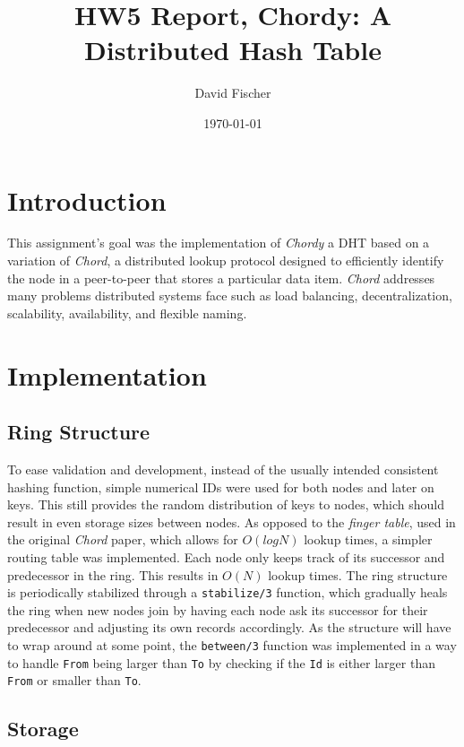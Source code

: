 \documentclass[a4paper, 11pt]{article}
\title{HW5 Report, Chordy: A Distributed Hash Table}
\author{David Fischer}
\date{\today{}}
\begin{document}
\maketitle

\section{Introduction}
This assignment's goal was the implementation of \textit{Chordy} a DHT based on a variation of \textit{Chord}, a distributed lookup protocol designed to efficiently identify the node in a peer-to-peer that stores a particular data item.
\textit{Chord} addresses many problems distributed systems face such as load balancing, decentralization, scalability, availability, and flexible naming.

\section{Implementation}

\subsection{Ring Structure}

To ease validation and development, instead of the usually intended consistent hashing function, simple numerical IDs were used for both nodes and later on keys. This still provides the random distribution of keys to nodes, which should result in even storage sizes between nodes.
As opposed to the \textit{finger table}, used in the original \textit{Chord} paper, which allows for $O(log N)$ lookup times, a simpler routing table was implemented. Each node only keeps track of its successor and predecessor in the ring. This results in $O(N)$ lookup times.
The ring structure is periodically stabilized through a \texttt{stabilize/3} function, which gradually heals the ring when new nodes join by having each node ask its successor for their predecessor and adjusting its own records accordingly.
As the structure will have to wrap around at some point, the \texttt{between/3} function was implemented in a way to handle \texttt{From} being larger than \texttt{To} by checking if the \texttt{Id} is either larger than \texttt{From} or smaller than \texttt{To}.

\subsection{Storage}
\end{document}
